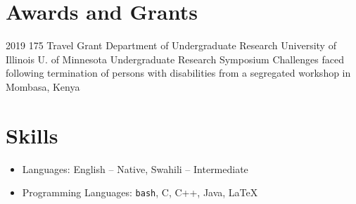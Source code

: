 \documentclass{cv}
\begin{document}

\section{Awards and Grants}
\secitemgrant
	{2019}
	{175}
	{Travel Grant}
	{Department of Undergraduate Research}
	{University of Illinois}
	{U. of Minnesota Undergraduate Research Symposium}
	{Challenges faced following termination of persons with disabilities from a segregated workshop in Mombasa, Kenya}

\section{Skills}
\begin{itemize}
  \item Languages: English -- Native, Swahili -- Intermediate
  \item Programming Languages: {\texttt {bash}}, C, C++, Java, \LaTeX
\end{itemize}

%
%
\end{document}
